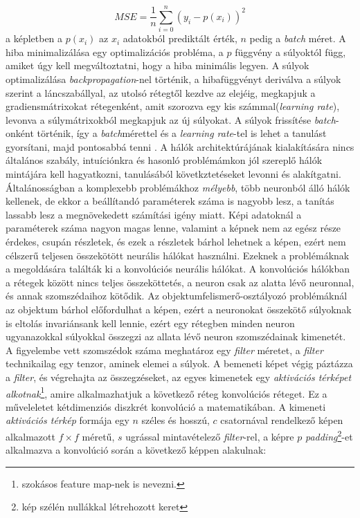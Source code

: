 \documentclass[12pt,letterpaper,twoside,openright]{book}
\begin{document}
\begin{equation}
MSE = \frac{1}{n}\sum^n_{i =0}(y_i -p(x_i))^2
\end{equation}
a képletben a $p(x_i)$ az $x_i$ adatokból prediktált érték, $n$ pedig a \textit{batch} méret. A hiba minimalizálása egy optimalizációs probléma, a $p$ függvény a súlyoktól függ, amiket úgy kell megváltoztatni, hogy a hiba minimális legyen. A súlyok optimalizálása \textit{backpropagation}-nel történik, a hibafüggvényt deriválva a súlyok szerint a láncszabállyal, az utolsó rétegtől kezdve az elejéig, megkapjuk a gradiensmátrixokat rétegenként, amit szorozva egy kis számmal(\textit{learning rate}), levonva a súlymátrixokból megkapjuk az új súlyokat. A súlyok frissítése \textit{batch}-onként történik, így a \textit{batch}mérettel és a \textit{learning rate}-tel is lehet a tanulást gyorsítani, majd pontosabbá tenni \cite{batchs}.
\newline\indent
A hálók architektúrájának kialakítására nincs általános szabály, intuíciónkra és hasonló problémámkon jól szereplő hálók mintájára kell hagyatkozni, tanulásából követkztetéseket levonni és alakítgatni. Általánosságban a komplexebb problémákhoz \textit{mélyebb}, több neuronból álló hálók kellenek, de ekkor a beállítandó paraméterek száma is nagyobb lesz, a tanítás lassabb lesz a megnövekedett számítási igény miatt. Képi adatoknál a paraméterek száma nagyon magas lenne, valamint a képnek nem az egész része érdekes, csupán részletek, és ezek a részletek bárhol lehetnek a képen, ezért nem célszerű teljesen összekötött neurális hálókat használni. Ezeknek a problémáknak a megoldására találták ki a konvolúciós neurális hálókat.
\newline\indent
A konvolúciós hálókban a rétegek között nincs teljes összeköttetés, a neuron csak az alatta lévő neuronnal, és annak szomszédaihoz kötődik. Az objektumfelismerő-osztályozó problémáknál az objektum bárhol előfordulhat a képen, ezért a neuronokat összekötő súlyoknak is eltolás invariánsank kell lennie, ezért egy rétegben minden neuron ugyanazokkal súlyokkal összegzi az allata lévő neuron szomszédainak kimenetét. A figyelembe vett szomszédok száma meghatároz egy \textit{filter} méretet, a \textit{filter} technikailag egy tenzor, aminek elemei a súlyok. A bemeneti képet végig páztázza a \textit{filter}, és végrehajta az összegzéseket, az egyes kimenetek egy \textit{aktivációs térképet alkotnak}\footnote{szokásos feature map-nek is nevezni.}, amire alkalmazhatjuk a következő réteg konvolúciós réteget. Ez a műveleletet kétdimenziós diszkrét konvolúció a matematikában. A kimeneti \textit{aktivációs térkép} formája egy $n$ széles és hosszú, $c$ csatornával rendelkező képen alkalmazott $f\times f$ méretű, $s$ ugrással mintavételező \textit{filter}-rel, a képre $p$ \textit{padding}\footnote{kép szélén nullákkal létrehozott keret}-et alkalmazva a konvolúció során a következő képpen alakulnak:
\end{document}
